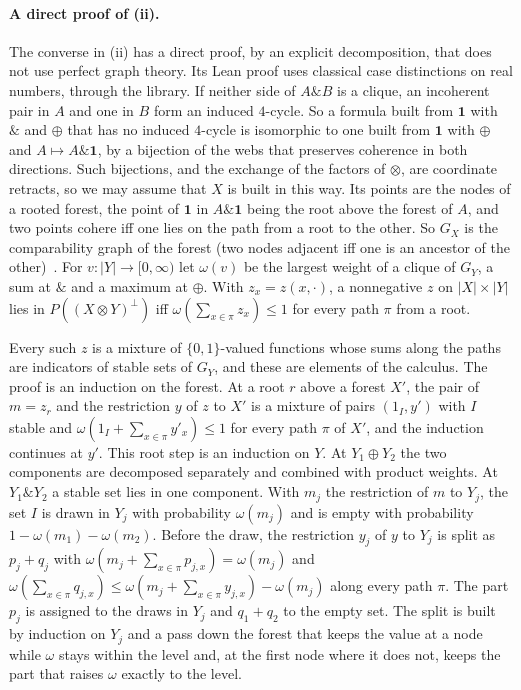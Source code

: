 \paragraph{A direct proof of (ii).}
The converse in (ii) has a direct proof, by an explicit decomposition,
that does not use perfect graph theory. Its Lean proof uses classical
case distinctions on real numbers, through the library. If neither side of $A \mathbin{\&} B$ is a clique, an
incoherent pair in $A$ and one in $B$ form an induced $4$-cycle. So a
formula built from $\mathbf{1}$ with $\mathbin{\&}$ and $\oplus$ that has
no induced $4$-cycle is isomorphic to one built from $\mathbf{1}$ with
$\oplus$ and $A \mapsto A \mathbin{\&} \mathbf{1}$, by a bijection of the
webs that preserves coherence in both directions.
Such bijections, and the exchange of the factors of $\otimes$, are
coordinate retracts, so we may assume that $X$ is built in this way. Its
points are the nodes of a rooted forest, the point of $\mathbf{1}$ in
$A \mathbin{\&} \mathbf{1}$ being the root above the forest of $A$, and
two points cohere iff one lies on the path from a root to the other. So
$G_X$ is the comparability graph of the forest (two nodes adjacent iff
one is an ancestor of the other)~\cite{wolk1962,golumbic1978}. For
$v : |Y| \to [0, \infty)$ let $\omega(v)$ be the largest weight of a
clique of $G_Y$, a sum at $\mathbin{\&}$ and a maximum at $\oplus$. With
$z_x = z(x, \cdot)$, a nonnegative $z$ on $|X| \times |Y|$ lies in
$P((X \otimes Y)^{\perp})$ iff $\omega(\sum_{x \in \pi} z_x) \le 1$ for
every path $\pi$ from a root.

Every such $z$ is a mixture of $\{0,1\}$-valued functions whose sums
along the paths are indicators of stable sets of $G_Y$, and these are
elements of the calculus. The proof is an induction on
the forest. At a root $r$ above a forest $X'$, the pair of $m = z_r$ and
the restriction $y$ of $z$ to $X'$ is a mixture of pairs $(1_I, y')$ with
$I$ stable and $\omega(1_I + \sum_{x \in \pi} y'_x) \le 1$ for every path
$\pi$ of $X'$, and the induction continues at $y'$. This root step is an
induction on $Y$. At $Y_1 \oplus Y_2$ the two components are decomposed
separately and combined with product weights. At $Y_1 \mathbin{\&} Y_2$
a stable set lies in one component. With $m_j$ the restriction of $m$ to
$Y_j$, the set $I$ is drawn in $Y_j$ with probability $\omega(m_j)$ and is
empty with probability $1 - \omega(m_1) - \omega(m_2)$. Before the draw,
the restriction $y_j$ of $y$ to $Y_j$ is split as $p_j + q_j$ with
$\omega(m_j + \sum_{x \in \pi} p_{j,x}) = \omega(m_j)$ and
$\omega(\sum_{x \in \pi} q_{j,x}) \le \omega(m_j + \sum_{x \in \pi}
y_{j,x}) - \omega(m_j)$ along every path $\pi$. The part $p_j$ is
assigned to the draws in $Y_j$ and $q_1 + q_2$ to the empty set. The
split is built by induction on $Y_j$ and a pass down the forest that
keeps the value at a node while $\omega$ stays within the level and, at
the first node where it does not, keeps the part that raises $\omega$
exactly to the level.

